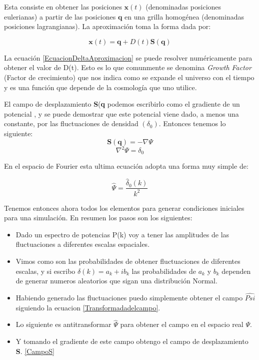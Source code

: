 Esta consiste en obtener las posiciones $\textbf{x}(t)$ (denominadas posiciones eulerianas) a partir de las posiciones $\textbf{q}$ en una grilla homog\'enea (denominadas posiciones lagrangianas). La aproximaci\'on toma la forma dada por:

\begin{equation}
    \textbf{x}(t)=\textbf{q}+D(t)\textbf{S}(\textbf{q}) 
    \label{Zeldovich}
\end{equation}{}

La ecuaci\'on \ref{EcuacionDeltaAproximacion} se puede resolver num\'ericamente para obtener el valor de D(t). Esto es lo que comunmente se denomina \textit{Growth Factor} (Factor de crecimiento) que nos indica como se expande el universo con el tiempo y es una funci\'on que depende de la cosmolog\'ia que uno utilice.

El campo de desplazamiento \textbf{S}(\textbf{q} podemos escribirlo como el gradiente de un potencial \citep{Zeldovich1970}, y se puede demostrar que este potencial viene dado, a menos una constante, por las fluctuaciones de densidad $(\delta_{0})$. Entonces tenemos lo siguiente: 
\begin{equation}
    \textbf{S}(\textbf{q})=-\nabla\Psi
    \label{CampoS}
\end{equation}{}
\begin{equation}
    \nabla ^{2}\Psi=\delta_{0}
\end{equation}{}

En el espacio de Fourier esta ultima ecuaci\'on adopta una forma muy simple de:

\begin{equation}
    \hat{\Psi}=\frac{\hat{\delta}_{0}(k)}{k^{2}}
    \label{Transformadadelcampo}
\end{equation}{}

Tenemos entonces ahora todos los elementos para generar condiciones iniciales para una simulaci\'on. En resumen los pasos son los siguientes:
\begin{itemize}
    \item Dado un espectro de potencias P(k) voy a tener las amplitudes de las fluctuaciones a diferentes escalas espaciales.
    \item Vimos como son las probabilidades de obtener fluctuaciones de diferentes escalas, y si escribo $\delta(k)=a_{k} + i b_ {k}$ las probabilidades de $a_{k}$ y $b_{k}$ dependen de generar numeros aleatorios que sigan una distribuci\'on Normal.
    \item Habiendo generado las fluctuaciones puedo simplemente obtener el campo $\hat{Psi}$ siguiendo la ecuacion \ref{Transformadadelcampo}.
    \item Lo siguiente es antitransformar $\hat{\Psi}$ para obtener el campo en el espacio real $\Psi$.
    \item Y tomando el gradiente de este campo obtengo el campo de desplazamiento \textbf{S}. \ref{CampoS}
\end{itemize}{}

